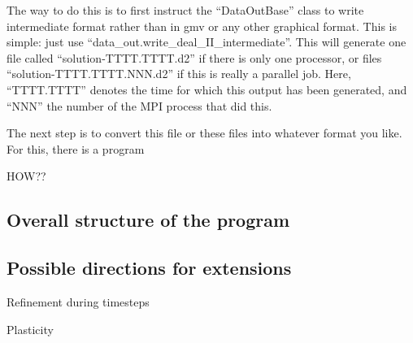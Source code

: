 \documentclass{article}
\begin{document}
The way to do this is to first instruct the ``DataOutBase'' class to
write intermediate format rather than in gmv or any other graphical
format. This is simple: just use
``data\_out.write\_deal\_II\_intermediate''. This will generate one file
called ``solution-TTTT.TTTT.d2'' if there is only one processor, or
files ``solution-TTTT.TTTT.NNN.d2'' if this is really a parallel
job. Here, ``TTTT.TTTT'' denotes the time for which this output has
been generated, and ``NNN'' the number of the MPI process that did this.

The next step is to convert this file or these files into whatever
format you like. For this, there is a program

HOW??


\subsection*{Overall structure of the program}
\subsection*{Possible directions for extensions}

Refinement during timesteps

Plasticity
\end{document}
